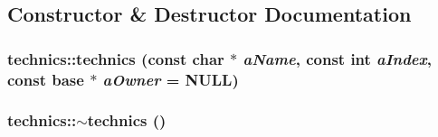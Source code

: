 \subsection{Constructor \& Destructor Documentation}
\hypertarget{classtechnics_a47b746b0d44d885fe95cadf0f4e7c0a1}{
\subsubsection[{technics}]{\setlength{\rightskip}{0pt plus 5cm}technics::technics (const char $\ast$ {\em aName}, \/  const int {\em aIndex}, \/  const {\bf base} $\ast$ {\em aOwner} = {\ttfamily NULL})}}
\label{classtechnics_a47b746b0d44d885fe95cadf0f4e7c0a1}
\hypertarget{classtechnics_a82e253113692a5bec7627f9b20f4b943}{
\subsubsection[{$\sim$technics}]{\setlength{\rightskip}{0pt plus 5cm}technics::$\sim$technics ()}}
\label{classtechnics_a82e253113692a5bec7627f9b20f4b943}


